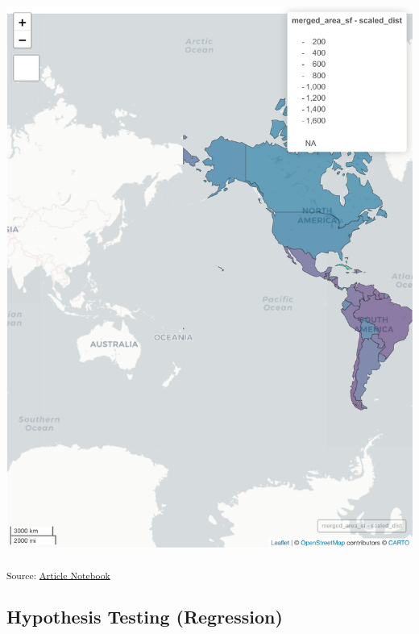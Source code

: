 \documentclass[
  letterpaper,
  DIV=11,
  numbers=noendperiod]{scrartcl}
\begin{document}
\includegraphics{index_files/figure-pdf/plot-area-1.pdf}

\textsubscript{Source:
\href{https://jpowerj.github.io/gis-manuscript-template/index.qmd.html}{Article
Notebook}}

\subsection{Hypothesis Testing
(Regression)}\label{hypothesis-testing-regression}
\end{document}
